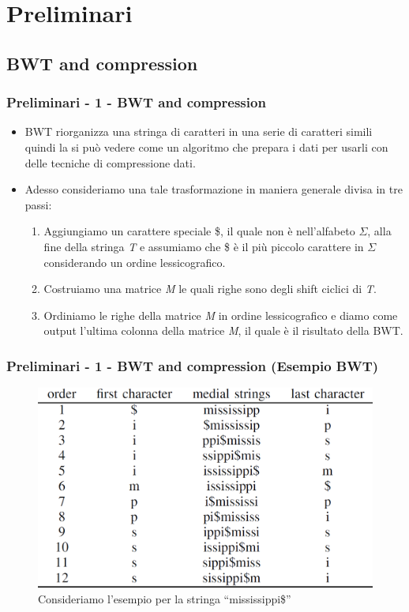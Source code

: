 \documentclass{beamer}
\begin{document}
\section{Preliminari}
\subsection{BWT and compression}
\begin{frame}
\frametitle{Preliminari - 1 - BWT and compression}
	\begin{itemize}
	 \item BWT riorganizza una stringa di caratteri in una serie di caratteri simili quindi la si può vedere come un algoritmo che prepara i dati per usarli con delle tecniche di compressione dati.\pause
	 \item Adesso consideriamo una tale trasformazione in maniera generale divisa in tre passi:\pause
	 \begin{enumerate}
	 	\item Aggiungiamo un carattere speciale \$, il quale non è nell'alfabeto $\Sigma$, alla fine della stringa \textit{T} e assumiamo che \$ è il più piccolo carattere in $\Sigma$ considerando un ordine lessicografico.\pause
	 	\item Costruiamo una matrice \textit{M} le quali righe sono degli shift ciclici di \textit{T}.\pause
	 	\item Ordiniamo le righe della matrice \textit{M} in ordine lessicografico e diamo come output l’ultima colonna della matrice \textit{M}, il quale è il risultato della BWT.	\pause
	 \end{enumerate}
	\end{itemize}
\end{frame}

\begin{frame}
\frametitle{Preliminari - 1 - BWT and compression (Esempio BWT)}
 \begin{figure}[H]
 	\centering
 	\includegraphics[scale=0.45]{Immagini/BWTExample}
 	\caption{Consideriamo l'esempio per la stringa ``mississippi\$''}
 \end{figure}
\end{frame}
\end{document}
